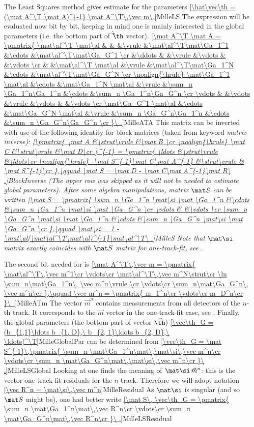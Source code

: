The Least Squares method gives estimate for the parameters
\eqref{\hat\vec\th = (\mat A^\T \mat A)^{-1} \mat A^\T\,\vec m\.}{MilleLS}
The \rhs expression will be evaluated now bit by bit, keeping in mind one is mainly interested in the global parameters (i.e. the bottom part of $\hat\vec\th$ vector).
\eqref{\mat A^\T \mat A = \pmatrix{
\mat\al^\T \mat\al	&		&						&\vrule	&\mat\al^\T\mat\Ga_1^1	&\cdots	&\mat\al^\T\mat\Ga_G^1	\cr
					&\ddots	&						&\vrule	&\vdots					&		&\vdots					\cr
					&		&\mat\al^\T \mat\al		&\vrule	&\mat\al^\T\mat\Ga_1^N	&\cdots	&\mat\al^\T\mat\Ga_G^N	\cr
\noalign{\hrule}
\mat\Ga_1^1 \mat\al	&\cdots	&\mat\Ga_1^N \mat\al	&\vrule	&\sum_n \Ga_1^n\Ga_1^n	&\cdots	&\sum_n \Ga_1^n\Ga_G^n	\cr
\vdots				&		&\vdots					&\vrule	&\vdots					&		&\vdots					\cr
\mat\Ga_G^1 \mat\al	&\cdots	&\mat\Ga_G^N \mat\al	&\vrule	&\sum_n \Ga_G^n\Ga_1^n	&\cdots	&\sum_n \Ga_G^n\Ga_G^n	\cr
}\ .}{MilleATA}
This matrix can be inverted with use of the following identity for block matrices (taken from  keyword \em{matrix inverse}):
\eqref{\pmatrix{
\mat A	&\strut\vrule	&\mat B	\cr
\noalign{\hrule}
\mat C	&\strut\vrule	&\mat D\cr
}^{-1} = \pmatrix{
\ldots							&\strut\vrule	&\ldots\cr
\noalign{\hrule}
-\mat S^{-1}\mat C\mat A^{-1}	&\strut\vrule	& \mat S^{-1}\cr
},\qquad \mat S = \mat D - \mat C\mat A^{-1}\mat B\ .}{BlockInverse}
(The upper row was skipped as it will not be needed to estimate global parameters). After some algebra manipulations, matrix $\mat S$ can be written
\eqref{\mat S = \pmatrix{
\sum_n \Ga_1^n \mat\si \mat \Ga_1^n	&\cdots	&\sum_n \Ga_1^n \mat\si \mat \Ga_G^n	\cr
\vdots								&		&\vdots									\cr
\sum_n \Ga_G^n \mat\si \mat \Ga_1^n	&\cdots	&\sum_n \Ga_G^n \mat\si \mat \Ga_G^n	\cr
},\qquad \mat\si = 1 - \mat\al(\mat\al^\T\mat\al)^{-1}\mat\al^\T\ .}{MilleS}
Note that $\mat\si$ matrix exactly coincides with $\mat S$ matrix for one-track-fit, see .

The second bit needed for  is
\eqref{\mat A^\T\,\vec m = \pmatrix{
\mat\al^\T\,\vec m^1\cr
\vdots\cr
\mat\al^\T\,\vec m^N\strut\cr
\ln
\sum_n\mat\Ga_1^n\, \vec m^n\vrule width0pt height15pt\cr
\vdots\cr
\sum_n\mat\Ga_G^n\, \vec m^n\cr
},\qquad \vec m^n = \pmatrix{
m_1^n\cr
\vdots\cr
m_D^n\cr
}\ .}{MilleATm}
The vector $\vec m^n$ contains measurements from all detectors of the $n$-th track. It corresponds to the $\vec m$ vector in the one-track-fit case, see . Finally, the global parameters (the bottom part of vector $\vec\th$)
\eqref{\vec\th_G = (b_{1,1}\ldots b_{1, D},\ b_{2, 1}\ldots b_{2, D},\ \ldots)^\T}{MilleGlobalPar}
can be determined from 
\eqref{\vec\th_G = \mat S^{-1}\,\pmatrix{
\sum_n \mat\Ga_1^n\mat\,\mat\si\,\vec m^n\cr
\vdots\cr
\sum_n \mat\Ga_G^n\mat\,\mat\si\,\vec m^n\cr
}\ .}{MilleLSGlobal}
Looking at  one finds the meaning of $\mat\si\,\vec m^n$: this is the vector one-track-fit residuals for the $n$-track. Therefore we will adopt notation
\eqref{\vec R^n = \mat\si\,\vec m^n}{MilleResidual}
As $\mat\si$ is singular (and so $\mat S$ might be), one had better write
\eqref{\mat S\, \vec\th_G = \pmatrix{
\sum_n \mat\Ga_1^n\mat\,\vec R^n\cr
\vdots\cr
\sum_n \mat\Ga_G^n\mat\,\vec R^n\cr
}\ .}{MilleLSResidual}



